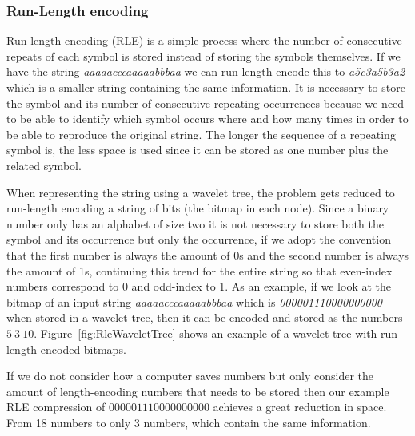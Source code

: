 \subsubsection{Run-Length encoding}
\label{sec:RLE}
Run-length encoding (RLE) is a simple process where the number of consecutive repeats of each symbol is stored instead of storing the symbols themselves. 
If we have the string \textit{aaaaacccaaaaabbbaa} we can run-length encode this to \textit{a5c3a5b3a2} which is a smaller string containing the same information.
It is necessary to store the symbol and its number of consecutive repeating occurrences because we need to be able to identify which symbol occurs where and how many times in order to be able to reproduce the original string.
The longer the sequence of a repeating symbol is, the less space is used since it can be stored as one number plus the related symbol.

When representing the string using a wavelet tree, the problem gets reduced to run-length encoding a string of bits (the bitmap in each node).
Since a binary number only has an alphabet of size two it is not necessary to store both the symbol and its occurrence but only the occurrence, if we adopt the convention that the first number is always the amount of 0s and the second number is always the amount of 1s, continuing this trend for the entire string so that even-index numbers correspond to 0 and odd-index to 1. 
As an example, if we look at the bitmap of an input string \textit{aaaaacccaaaaabbbaa} which is \textit{000001110000000000} when stored in a wavelet tree, then it can be encoded and stored as the numbers $5~3~10$.
Figure~\ref{fig:RleWaveletTree} shows an example of a wavelet tree with run-length encoded bitmaps.

If we do not consider how a computer saves numbers but only consider the amount of length-encoding numbers that needs to be stored then our example RLE compression of $000001110000000000$ achieves a great reduction in space.
From 18 numbers to only 3 numbers, which contain the same information.

